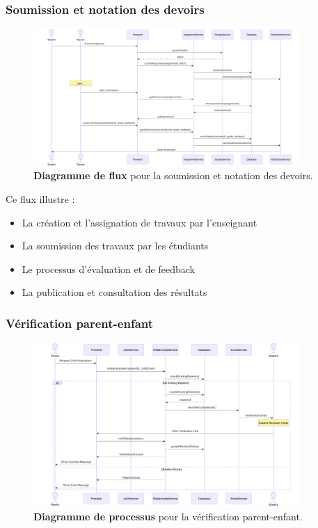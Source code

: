 \subsubsection{Soumission et notation des devoirs}

\begin{figure}[H]
  \centering
  \includegraphics[width=0.9\textwidth,keepaspectratio]{pfe-pics/diagrames/Assignment Submission and Grading.png}
  \caption{\textbf{Diagramme de flux} pour la soumission et notation des devoirs.}
  \label{fig:assignment_grading}
\end{figure}

Ce flux illustre :

\begin{itemize}
  \item La création et l'assignation de travaux par l'enseignant
  
  \item La soumission des travaux par les étudiants
  
  \item Le processus d'évaluation et de feedback
  
  \item La publication et consultation des résultats
\end{itemize}

\subsubsection{Vérification parent-enfant}

\begin{figure}[H]
  \centering
  \includegraphics[width=0.9\textwidth,keepaspectratio]{pfe-pics/diagrames/Parent-Child Verification Process.png}
  \caption{\textbf{Diagramme de processus} pour la vérification parent-enfant.}
  \label{fig:parent_child_verification}
\end{figure}

